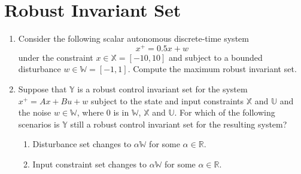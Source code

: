 \setcounter{section}{0}

\section{Robust Invariant Set}
\begin{enumerate}
    \item Consider the following scalar autonomous discrete-time system 
    \begin{equation*}
        x^+ = 0.5x + w 
    \end{equation*}
    under the constraint $x \in \mathbb{X} = [-10, 10]$ and subject to a bounded disturbance $w \in \mathbb{W} = [-1, 1]$. Compute the maximum robust invariant set. \vspace{5\baselineskip}
    \item Suppose that $\mathbb{Y}$ is a robust control invariant set for the system $x^+ = Ax+ Bu+ w $ subject to the state and input constraints $\mathbb{X}$ and $\mathbb{U}$ and the noise $w \in \mathbb{W}$, where $0$ is in $\mathbb{W}$, $\mathbb{X}$ and $\mathbb{U}$. For which of the following scenarios is $\mathbb{Y}$ still a robust control invariant set for the resulting system?
    \begin{enumerate}
        \item Disturbance set changes to $\alpha \mathbb{W}$ for some $\alpha \in \mathbb{R}$. \vspace{5\baselineskip}
        \item Input constraint set changes to $\alpha \mathbb{W}$ for some $\alpha \in \mathbb{R}$. \vspace{5\baselineskip}
    \end{enumerate}
\end{enumerate}

